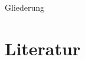 \documentclass{beamer}
\begin{document}
\maketitle

\begin{frame}{Gliederung}
  \tableofcontents[hideallsubsections]
\end{frame}







\section{Literatur}

\nocite{*}

\begin{frame}[allowframebreaks]{\insertsubsection}
    \begingroup
    \small
    \beamertemplatebookbibitems
    
    
    \endgroup
\end{frame}
\end{document}
